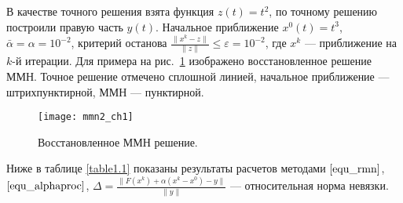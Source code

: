  В качестве точного решения взята функция $z(t)=t^2$, по точному решению построили правую часть $y(t)$.  Начальное приближение $x^0(t)=t^3$, $\bar\alpha=\alpha=10^{-2}$, критерий останова $\frac{\|x^k-z\|}{\|z\|}\le\varepsilon=10^{-2}$, где $x^k$ --- приближение на $k$-й итерации. Для примера на рис.~\ref{fig:mmn_ch1} изображено восстановленное решение ММН. Точное решение отмечено сплошной линией, начальное приближение --- штрихпунктирной, ММН --- пунктирной. 
\begin{figure}[h]
	\centering
	\texttt{[image: mmn2\_ch1]}
	\caption{Восстановленное ММН решение.}
	\label{fig:mmn_ch1}
\end{figure}
Ниже в таблице \ref{table1.1} показаны результаты расчетов методами $\eqref{equ_rmn}$, $\eqref{equ_alphaproc}$, $\Delta=\frac{\|F(x^k)+\alpha(x^k-x^0)-y\|}{\|y\|}$ --- относительная норма невязки. 
